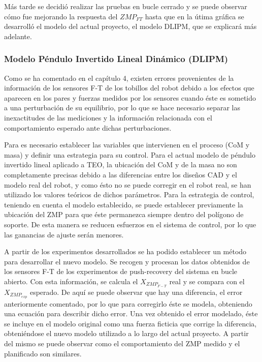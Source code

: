 Más tarde se decidió realizar las pruebas en bucle cerrado y se puede observar cómo fue mejorando la respuesta del $ZMP_{FT}$ hasta que en la útima gráfica se desarrolló el modelo del actual proyecto, el modelo DLIPM, que se explicará más adelante.



\subsubsection{Modelo Péndulo Invertido Lineal Dinámico (DLIPM)}

Como se ha comentado en el capítulo 4, existen errores provenientes de la información de los sensores F-T de los tobillos del robot debido a los efectos que aparecen en los pares y fuerzas medidos por los sensores cuando éste es sometido a una perturbación de su equilibrio, por lo que se hace necesario separar las inexactitudes de las mediciones y la información relacionada con el comportamiento esperado ante dichas perturbaciones.

Para es necesario establecer las variables que intervienen en el proceso (CoM y masa) y definir una estrategia para su control. Para el actual modelo de péndulo invertido lineal aplicado a TEO, la ubicación del CoM y de la masa no son completamente precisas debido a las diferencias entre los diseños CAD y el modelo real del robot, y como ésto no se puede corregir en el robot real, se han utilizado los valores teóricos de dichos parámetros. Para la estrategia de control, teniendo en cuenta el modelo establecido, se puede establecer previamente la ubicación del ZMP para que éste permanezca siempre dentro del polígono de soporte. De esta manera se reducen esfuerzos en el sistema de control, por lo que las ganancias de ajuste serán menores.

A partir de los experimentos desarrollados se ha podido establecer un método para desarrollar el nuevo modelo. Se recogen y procesan los datos obtenidos de los sensores F-T de los experimentos de push-recovery del sistema en bucle abierto. Con esta información, se calcula el $X_{ZMP_{F-T}}$ real y se compara con el $X_{ZMP_{exp}}$ esperado. De aquí se puede observar que hay una diferencia, el error anteriormente comentado, por lo que para corregirlo éste se modela, obteniendo una ecuación para describir dicho error. Una vez obtenido el error modelado, éste se incluye en el modelo original como una fuerza ficticia que corrige la diferencia, obteniéndose el nuevo modelo utilizado a lo largo del actual proyecto. A partir del mismo se puede observar como el comportamiento del ZMP medido y el planificado son similares.

